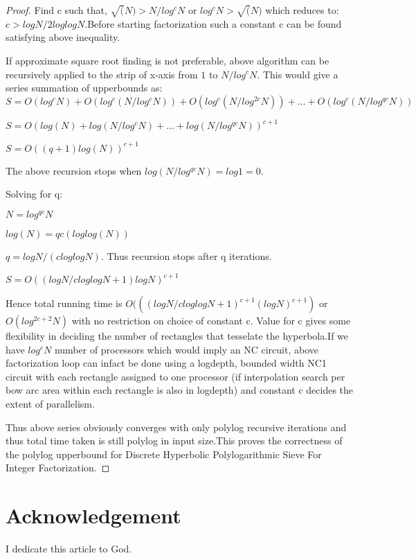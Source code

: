 \documentclass[11pt,onecolumn]{article}
\begin{document}
\begin{proof}
Find c such that, $\sqrt(N) > N/log^{c}N$ or $log^{c}N > \sqrt(N)$ which reduces to:
$c > logN/2loglogN$.Before starting factorization such a constant c can be found satisfying above inequality. 


If approximate square root finding is not preferable, above algorithm can be recursively applied to the strip of x-axis from $1$ to $N/log^{c}N$. This would give a series summation of upperbounds as:
$S=O(log^{c}N) +O(log^{c}(N/log^{c}N)) + O(log^{c}(N/log^{2c}N)) +...+O(log^{c}(N/log^{qc}N))$

$S = O(log(N) +log(N/log^{c}N) + ... + log(N/log^{qc}N))^{c+1}$

$S = O((q+1)log(N))^{c+1}$

The above recursion stops when $log(N/log^{qc}N) = log 1 = 0$.

Solving for q:

$N = log^{qc}N$

$log(N) = qc(loglog(N))$

$q = logN/(cloglogN)$. Thus recursion stops after q iterations.

$S = O((logN/cloglogN + 1)logN)^{c+1}$

Hence total running time is $O(((logN/cloglogN + 1)^{c+1}(logN)^{c+1})$ or $O(log^{2c+2}N)$ with no restriction on choice of constant c. Value for c gives some flexibility in deciding the number of rectangles that tesselate the hyperbola.If we have $log^{c}N$ number of processors which would imply an NC circuit, above factorization loop can infact be done using a logdepth, bounded width NC1 circuit with each rectangle assigned to one processor (if interpolation search per bow arc area within each rectangle is also in logdepth) and constant c decides the extent of parallelism.


Thus above series obviously converges with only polylog recursive iterations and thus total time taken is still polylog in input size.This proves the correctness of the polylog upperbound for Discrete Hyperbolic Polylogarithmic Sieve For Integer Factorization.

\end{proof}
\section{Acknowledgement}
I dedicate this article to God.
\end{document}
